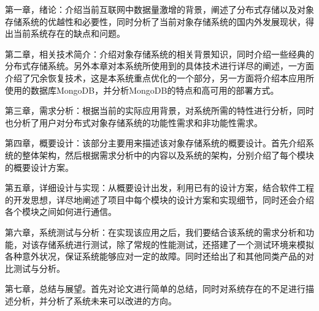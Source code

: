 第一章，绪论：介绍当前互联网中数据量激增的背景，阐述了分布式存储以及对象存储系统的优越性和必要性，同时分析了当前对象存储系统的国内外发展现状，得出当前系统存在的缺点和问题。

第二章，相关技术简介：介绍对象存储系统的相关背景知识，同时介绍一些经典的分布式存储系统。另外本章对本系统所使用到的具体技术进行详尽的阐述，一方面介绍了冗余恢复技术，这是本系统重点优化的一个部分，另一方面将介绍本应用所使用的数据库MongoDB，并分析MongoDB的特点和高可用的部署方式。 

第三章，需求分析：根据当前的实际应用背景，对系统所需的特性进行分析，同时也分析了用户对分布式对象存储系统的功能性需求和非功能性需求。

第四章，概要设计：该部分主要用来描述该对象存储系统的概要设计。首先介绍系统的整体架构，然后根据需求分析中的内容以及系统的架构，分别介绍了每个模块的概要设计方案。

第五章，详细设计与实现：从概要设计出发，利用已有的设计方案，结合软件工程的开发思想，详尽地阐述了项目中每个模块的设计方案和实现细节，同时还会介绍各个模块之间如何进行通信。

第六章，系统测试与分析：在实现该应用之后，我们要结合该系统的需求分析和功能，对该存储系统进行测试，除了常规的性能测试，还搭建了一个测试环境来模拟各种意外状况，保证系统能够应对一定的故障。同时还给出了和其他同类产品的对比测试与分析。

第七章，总结与展望。首先对论文进行简单的总结，同时对系统存在的不足进行描述分析，并分析了系统未来可以改进的方向。